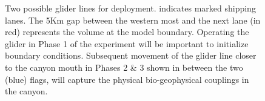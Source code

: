\begin{figure}[!t]
  \centering 
  \hspace{+0.3cm} 
  \caption{Two possible \soc glider lines for
    deployment.  indicates marked shipping
    lanes. The 5Km  gap between the western most and the next lane
    (in red) represents the volume at the model boundary. Operating
    the glider in Phase 1 of the experiment will be important to
    initialize boundary conditions. Subsequent movement of the glider
    line closer to the \naz canyon mouth in Phases 2 \& 3 shown in
     between the two (blue) flags, will capture
    the physical bio-geophysical couplings in the \naz canyon.}
  \label{fig:glider-ops}
\end{figure}


